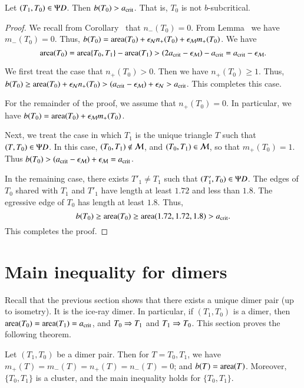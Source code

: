\begin{lemma}  
  Let $(T_1,T_0)\in\Psi D$.  Then $b(T_0) > a_\text{crit}$.  That is, $T_0$ is
  not $b$-subcritical.
\end{lemma}

\begin{proof}
  We recall from Corollary~ that $n_-(T_0)=0$.  From
  Lemma~ we have $m_-(T_0)=0$.  Thus, $b(T_0) =
  {\operatorname{area}}(T_0) + \epsilon_{\mathcal N} n_+(T_0) + \epsilon_{\mathcal M} m_+(T_0)$.  We have
\[
{\operatorname{area}}(T_0) = {\operatorname{area}}\{T_0,T_1\} - {\operatorname{area}}(T_1) 
> (2a_\text{crit}-\epsilon_{\mathcal M}) -a_\text{crit} = a_\text{crit} - \epsilon_{\mathcal M}.
\]

We first treat the case that $n_+(T_0)>0$.  Then we have $n_+(T_0)\ge
1$.  Thus, $b(T_0) \ge {\operatorname{area}}(T_0) + \epsilon_{\mathcal N} n_+(T_0) > (a_\text{crit} - \epsilon_{\mathcal M})
+ \epsilon_{\mathcal N} > a_\text{crit}$.  This completes this case.

For the remainder of the proof, we assume that $n_+(T_0)=0$.  In
particular, we have $b(T_0) = {\operatorname{area}}(T_0) + \epsilon_{\mathcal M} m_+(T_0)$.

Next, we treat the case in which $T_1$ is the unique triangle $T$ such
that $(T,T_0)\in\Psi D$.  In this case, $(T_0,T_1)\not\in\mathcal M$, and
$(T_0,T_1)\in\mathcal M$, so that $m_+(T_0)=1$.  Thus $b(T_0) > (a_\text{crit}-\epsilon_{\mathcal M})
+ \epsilon_{\mathcal M} = a_\text{crit}$.

In the remaining case, there exists $T'_1\ne T_1$ such that
$(T'_1,T_0)\in\Psi D$.  The edges of $T_0$ shared with $T_1$ and $T'_1$
have length at least $1.72$ and less than $1.8$.  The egressive edge
of $T_0$ has length at least $1.8$.  Thus,
\[
b(T_0) \ge {\operatorname{area}} (T_0) \ge {\operatorname{area}}(1.72,1.72,1.8) > a_\text{crit}.
\]
This completes the proof.
\end{proof}


\section{Main inequality for dimers}

Recall that the previous section shows that there exists a unique
dimer pair (up to isometry).  It is the ice-ray dimer.  In particular,
if $(T_1,T_0)$ is a dimer, then ${\operatorname{area}}(T_0)={\operatorname{area}}(T_1)=a_\text{crit}$, and
$T_0\Rightarrow T_1$ and $T_1\Rightarrow T_0$.  This section proves the following
theorem.

\begin{theorem} 
  Let $(T_1,T_0)$ be a dimer pair.  Then for $T=T_0,T_1$, we have
  $m_+(T)=m_-(T) = n_+(T)=n_-(T) = 0$; and $b(T) = {\operatorname{area}}(T)$.
  Moreover, $\{T_0,T_1\}$ is a cluster, and the main inequality holds
  for $\{T_0,T_1\}$.
\end{theorem}

